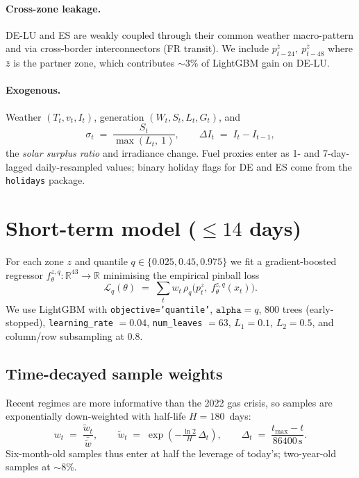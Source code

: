 \documentclass[11pt,a4paper]{article}
\newcommand{\DELU}{\textsf{DE-LU}}
\begin{document}
\paragraph{Cross-zone leakage.}
DE-LU and ES are weakly coupled through their common weather macro-pattern
and via cross-border interconnectors (FR transit). We include
$p_{t-24}^{\bar{z}},\ p_{t-48}^{\bar{z}}$ where $\bar{z}$ is the partner
zone, which contributes $\sim$$3\%$ of LightGBM gain on \DELU.

\paragraph{Exogenous.}
Weather $(T_t, v_t, I_t)$, generation $(W_t, S_t, L_t, G_t)$, and
\begin{equation}
  \sigma_t \;=\; \frac{S_t}{\max(L_t,\ 1)},
  \qquad
  \Delta I_t \;=\; I_t - I_{t-1},
\end{equation}
the \emph{solar surplus ratio} and irradiance change. Fuel proxies
enter as 1- and 7-day-lagged daily-resampled values; binary holiday
flags for DE and ES come from the \texttt{holidays} package.

\section{Short-term model ($\le 14$ days)}
\label{sec:short}

For each zone $z$ and quantile $q \in \{0.025, 0.45, 0.975\}$ we fit a
gradient-boosted regressor $f_{\theta}^{z,q}: \mathbb{R}^{43} \to \mathbb{R}$
minimising the empirical pinball loss
\begin{equation}
  \mathcal{L}_q(\theta) \;=\;
  \sum_{t} w_t \,\rho_q\!\bigl(p_t^z,\ f_{\theta}^{z,q}(x_t)\bigr).
  \label{eq:loss}
\end{equation}
We use LightGBM with \texttt{objective='quantile'}, $\texttt{alpha}=q$,
$800$ trees (early-stopped), \texttt{learning\_rate} $=0.04$,
\texttt{num\_leaves} $=63$, $L_1=0.1$, $L_2=0.5$, and column/row
subsampling at $0.8$.

\subsection{Time-decayed sample weights}

Recent regimes are more informative than the 2022 gas crisis, so
samples are exponentially down-weighted with half-life
$H = 180$~days:
\begin{equation}
  w_t \;=\; \frac{\tilde{w}_t}{\bar{\tilde{w}}}, \qquad
  \tilde{w}_t \;=\; \exp\!\left(-\tfrac{\ln 2}{H}\,\Delta_t\right), \qquad
  \Delta_t \;=\; \frac{t_{\max} - t}{86400 \, \mathrm{s}}.
\end{equation}
Six-month-old samples thus enter at half the leverage of today's;
two-year-old samples at $\sim$$8\%$.
\end{document}
